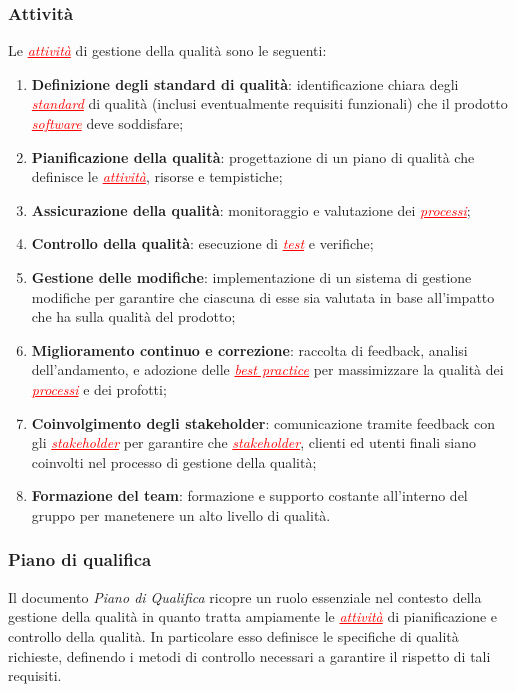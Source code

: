 \subsubsection{Attività}
Le \textcolor{red}{\uline{\textit{attività}}} di gestione della qualità sono le seguenti:
\begin{enumerate}
    \item \textbf{Definizione degli standard di qualità}: identificazione chiara degli \textcolor{red}{\uline{\textit{standard}}} di qualità
    (inclusi eventualmente requisiti funzionali) che il prodotto \textcolor{red}{\uline{\textit{software}}} deve soddisfare;
    \item \textbf{Pianificazione della qualità}: progettazione di un piano di qualità che definisce le \textcolor{red}{\uline{\textit{attività}}},
    risorse e tempistiche;
    \item \textbf{Assicurazione della qualità}: monitoraggio e valutazione dei \textcolor{red}{\uline{\textit{processi}}};
    \item \textbf{Controllo della qualità}: esecuzione di \textcolor{red}{\uline{\textit{test}}} e verifiche;
    \item \textbf{Gestione delle modifiche}: implementazione di un sistema di gestione modifiche per garantire che ciascuna di esse sia valutata
    in base all'impatto che ha sulla qualità del prodotto;
    \item \textbf{Miglioramento continuo e correzione}: raccolta di feedback, analisi dell'andamento, e adozione delle 
    \textcolor{red}{\uline{\textit{best practice}}} per massimizzare la qualità dei \textcolor{red}{\uline{\textit{processi}}} e dei profotti;
    \item \textbf{Coinvolgimento degli stakeholder}: comunicazione tramite feedback con gli \textcolor{red}{\uline{\textit{stakeholder}}} 
    per garantire che \textcolor{red}{\uline{\textit{stakeholder}}}, clienti ed utenti finali siano coinvolti nel processo di gestione della qualità;
    \item \textbf{Formazione del team}: formazione e supporto costante all'interno del gruppo per manetenere un alto livello di qualità.
\end{enumerate}

\subsubsection{Piano di qualifica}
Il documento \textit{Piano di Qualifica} ricopre un ruolo essenziale nel contesto della gestione della qualità in quanto tratta ampiamente
le \textcolor{red}{\uline{\textit{attività}}} di pianificazione e controllo della qualità. In particolare esso definisce le specifiche di qualità
richieste, definendo i metodi di controllo necessari a garantire il rispetto di tali requisiti.

